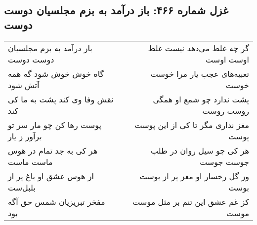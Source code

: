 \begin{center}
\section*{غزل شماره ۴۶۶: باز درآمد به بزم مجلسیان دوست دوست}
\label{sec:0466}
\begin{longtable}{l p{0.5cm} r}
باز درآمد به بزم مجلسیان دوست دوست
&&
گر چه غلط می‌دهد نیست غلط اوست اوست
\\
گاه خوش خوش شود گه همه آتش شود
&&
تعبیه‌های عجب یار مرا خوست خوست
\\
نقش وفا وی کند پشت به ما کی کند
&&
پشت ندارد چو شمع او همگی روست روست
\\
پوست رها کن چو مار سر تو برآور ز یار
&&
مغز نداری مگر تا کی از این پوست پوست
\\
هر کی به جد تمام در هوس ماست ماست
&&
هر کی چو سیل روان در طلب جوست جوست
\\
از هوس عشق او باغ پر از بلبل‌ست
&&
وز گل رخسار او مغز پر از بوست بوست
\\
مفخر تبریزیان شمس حق آگه بود
&&
کز غم عشق این تنم بر مثل موست موست
\\
\end{longtable}
\end{center}

